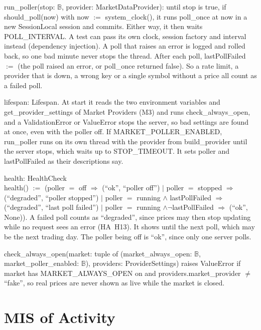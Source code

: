 \documentclass[12pt, titlepage]{article}
\begin{document}
\smallskip
\noindent run\_poller(stop: $\mathbb{B}$, provider: MarketDataProvider): until
stop is true, if should\_poll(now) with now $:=$ system\_clock(), it runs
poll\_once at now in a new SessionLocal session and commits. Either way, it
then waits POLL\_INTERVAL. A test can pass its own clock, session factory and
interval instead (dependency injection). A poll that raises an error is logged
and rolled back, so one bad minute never stops the thread. After
each poll, lastPollFailed $:=$ (the poll raised an error, or poll\_once
returned false). So a rate limit, a provider that is down, a wrong key or a
single symbol without a price all count as a failed poll.

\smallskip
{\raggedright
\noindent lifespan: Lifespan. At start it reads the two environment variables
and get\_provider\_settings of Market Providers (M3) and runs
check\_always\_open, and a ValidationError or ValueError stops the server, so
bad settings are found at once, even with the poller off. If
MARKET\_POLLER\_ENABLED, run\_poller runs on its own thread with the provider
from build\_provider until the server stops, which waits up to STOP\_TIMEOUT.
It sets poller and lastPollFailed as their descriptions say.\par}

\smallskip
\noindent health: HealthCheck\\
health() $:=$ (poller $=$ off $\Rightarrow$ (``ok'', ``poller off'') $|$
poller $=$ stopped $\Rightarrow$ (\mbox{``degraded''}, ``poller stopped'') $|$
poller $=$ running $\land$ lastPollFailed $\Rightarrow$ (\mbox{``degraded''},
``last poll failed'') $|$ poller $=$ running $\land \neg$lastPollFailed
$\Rightarrow$ (``ok'', None)). A failed poll counts as \mbox{``degraded''},
since prices may then stop updating while no request sees an error (HA~H13).
It shows until the next poll, which may be the next trading day. The poller
being off is ``ok'', since only one server polls.

\smallskip
\noindent check\_always\_open(market: tuple of (market\_always\_open: $\mathbb{B}$,
market\_poller\_enabled: $\mathbb{B}$), providers: ProviderSettings) raises
ValueError if market has MARKET\_ALWAYS\_OPEN on and providers.market\_provider
$\neq$ ``fake'', so real prices are never shown as live while the market is
closed.

\newpage

\section{MIS of Activity} \label{MisActivity}
\end{document}
